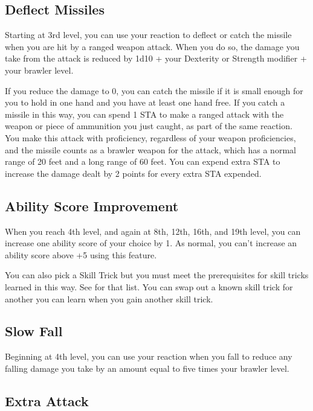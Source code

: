 \subsection{Deflect Missiles}

Starting at 3rd level, you can use your reaction to deflect or catch the missile when you are hit by a ranged weapon attack. When you do so, the damage you take from the attack is reduced by 1d10 + your Dexterity or Strength modifier + your brawler level.

If you reduce the damage to 0, you can catch the missile if it is small enough for you to hold in one hand and you have at least one hand free. If you catch a missile in this way, you can spend 1 STA to make a ranged attack with the weapon or piece of ammunition you just caught, as part of the same reaction. You make this attack with proficiency, regardless of your weapon proficiencies, and the missile counts as a brawler weapon for the attack, which has a normal range of 20 feet and a long range of 60 feet. You can expend extra STA to increase the damage dealt by 2 points for every extra STA expended.

\subsection{Ability Score Improvement}

When you reach 4th level, and again at 8th, 12th, 16th, and 19th level, you can increase one ability score of your choice by 1. As normal, you can't increase an ability score above +5 using this feature.

You can also pick a Skill Trick but you must meet the prerequisites for skill tricks learned in this way. See  for that list. You can swap out a known skill trick for another you can learn when you gain another skill trick.

\subsection{Slow Fall}

Beginning at 4th level, you can use your reaction when you fall to reduce any falling damage you take by an amount equal to five times your brawler level.

\subsection{Extra Attack}


